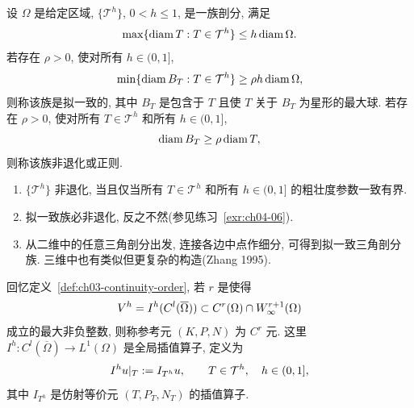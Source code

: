 \setcounter{thmcount}{12}
\begin{Definition}
\label{def:ch04-mesh-family-regularity}
设 $\Omega$ 是给定区域, $\{\mathcal T^h\}$, $0<h\leq1$, 是一族剖分, 满足
\begin{equation}
\MathBookFormulaID{formula-ch04-mesh-maximum-diameter}
\label{eq:ch04-mesh-maximum-diameter}
\max\{\operatorname{diam}T:T\in\mathcal T^h\}
\leq h\operatorname{diam}\Omega.
\end{equation}
若存在 $\rho>0$, 使对所有 $h\in(0,1]$,
\begin{equation}
\MathBookFormulaID{formula-ch04-quasi-uniform-mesh-family}
\label{eq:ch04-quasi-uniform-mesh-family}
\min\{\operatorname{diam}B_T:T\in\mathcal T^h\}
\geq\rho h\operatorname{diam}\Omega,
\end{equation}
则称该族是拟一致的, 其中 $B_T$ 是包含于 $T$ 且使 $T$ 关于 $B_T$ 为星形的最大球. 若存在 $\rho>0$, 使对所有 $T\in\mathcal T^h$ 和所有 $h\in(0,1]$,
\begin{equation}
\MathBookFormulaID{formula-ch04-regular-mesh-family}
\label{eq:ch04-regular-mesh-family}
\operatorname{diam}B_T\geq\rho\operatorname{diam}T,
\end{equation}
则称该族非退化或正则.
\end{Definition}

\setcounter{thmcount}{16}
\begin{Remark}
\label{rem:ch04-mesh-family-regularity-properties}
\begin{enumerate}
\item[(i)] $\{\mathcal T^h\}$ 非退化, 当且仅当所有 $T\in\mathcal T^h$ 和所有 $h\in(0,1]$ 的粗壮度参数一致有界.
\item[(ii)] 拟一致族必非退化, 反之不然(参见练习~\ref{exr:ch04-06}).
\item[(iii)] 从二维中的任意三角剖分出发, 连接各边中点作细分, 可得到拟一致三角剖分族. 三维中也有类似但更复杂的构造(Zhang 1995).
\end{enumerate}
\end{Remark}

回忆定义~\ref{def:ch03-continuity-order}, 若 $r$ 是使得
\begin{equation}
\MathBookFormulaID{formula-ch04-global-finite-element-space-regularity}
\label{eq:ch04-global-finite-element-space-regularity}
V^h=I^h(C^l(\overline\Omega))\subset C^r(\Omega)\cap W_\infty^{r+1}(\Omega)
\end{equation}
成立的最大非负整数, 则称参考元 $(K,P,N)$ 为 $C^r$ 元. 这里 $I^h:C^l(\overline\Omega)\to L^1(\Omega)$ 是全局插值算子, 定义为
\begin{equation}
\MathBookFormulaID{formula-ch04-global-interpolation-operator}
\label{eq:ch04-global-interpolation-operator}
I^h u|_T:=I_{T^h}u,\qquad T\in\mathcal T^h,\quad h\in(0,1],
\end{equation}
其中 $I_{T^h}$ 是仿射等价元 $(T,P_T,N_T)$ 的插值算子.


